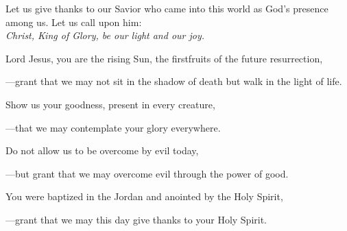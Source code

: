 \intercessions\indent

\begin{hangpar}

Let us give thanks to our Savior who came into this world as God’s presence among us. Let us call upon him:\\
\emph{Christ, King of Glory, be our light and our joy.}

\medskip Lord Jesus, you are the rising Sun, the firstfruits of the future resurrection,

{\color{red}---\thinspace}grant that we may not sit in the shadow of death but walk in the light of life.

\medskip Show us your goodness, present in every creature,

{\color{red}---\thinspace}that we may contemplate your glory everywhere.

\medskip Do not allow us to be overcome by evil today,

{\color{red}---\thinspace}but grant that we may overcome evil through the power of good.

\medskip You were baptized in the Jordan and anointed by the Holy Spirit,

{\color{red}---\thinspace}grant that we may this day give thanks to your Holy Spirit.

\end{hangpar}

